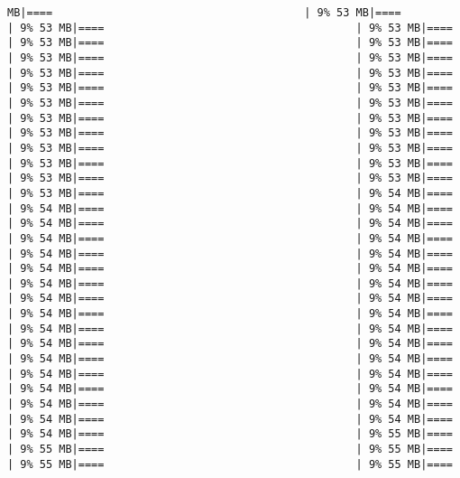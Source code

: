 \documentclass[
]{article}
\begin{document}
\begin{verbatim}
MB|====                                       | 9% 53 MB|====                                       | 9% 53 MB|====                                       | 9% 53 MB|====                                       | 9% 53 MB|====                                       | 9% 53 MB|====                                       | 9% 53 MB|====                                       | 9% 53 MB|====                                       | 9% 53 MB|====                                       | 9% 53 MB|====                                       | 9% 53 MB|====                                       | 9% 53 MB|====                                       | 9% 53 MB|====                                       | 9% 53 MB|====                                       | 9% 53 MB|====                                       | 9% 53 MB|====                                       | 9% 53 MB|====                                       | 9% 53 MB|====                                       | 9% 53 MB|====                                       | 9% 53 MB|====                                       | 9% 53 MB|====                                       | 9% 53 MB|====                                       | 9% 53 MB|====                                       | 9% 53 MB|====                                       | 9% 53 MB|====                                       | 9% 54 MB|====                                       | 9% 54 MB|====                                       | 9% 54 MB|====                                       | 9% 54 MB|====                                       | 9% 54 MB|====                                       | 9% 54 MB|====                                       | 9% 54 MB|====                                       | 9% 54 MB|====                                       | 9% 54 MB|====                                       | 9% 54 MB|====                                       | 9% 54 MB|====                                       | 9% 54 MB|====                                       | 9% 54 MB|====                                       | 9% 54 MB|====                                       | 9% 54 MB|====                                       | 9% 54 MB|====                                       | 9% 54 MB|====                                       | 9% 54 MB|====                                       | 9% 54 MB|====                                       | 9% 54 MB|====                                       | 9% 54 MB|====                                       | 9% 54 MB|====                                       | 9% 54 MB|====                                       | 9% 54 MB|====                                       | 9% 54 MB|====                                       | 9% 54 MB|====                                       | 9% 54 MB|====                                       | 9% 54 MB|====                                       | 9% 54 MB|====                                       | 9% 54 MB|====                                       | 9% 54 MB|====                                       | 9% 54 MB|====                                       | 9% 55 MB|====                                       | 9% 55 MB|====                                       | 9% 55 MB|====                                       | 9% 55 MB|====                                       | 9% 55 MB|====                  
\end{verbatim}
\end{document}
